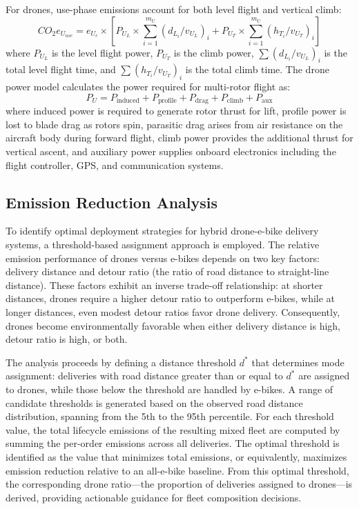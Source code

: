 \documentclass[11pt]{article}
\begin{document}
For drones, use-phase emissions account for both level flight and vertical climb:
\begin{equation}
  CO_2e_{U_{use}} = e_{U_c} \times \left[ P_{U_L} \times \sum_{i=1}^{m_U} (d_{L_i} / v_{U_L})_i + P_{U_T} \times \sum_{i=1}^{m_U} (h_{T_i} / v_{U_T})_i \right]
\end{equation}
where $P_{U_L}$ is the level flight power, $P_{U_T}$ is the climb power, $\sum (d_{L_i} / v_{U_L})_i$ is the total level flight time, and $\sum (h_{T_i} / v_{U_T})_i$ is the total climb time. The drone power model calculates the power required for multi-rotor flight as:
\begin{equation}
  P_{U} = P_{\text{induced}} + P_{\text{profile}} + P_{\text{drag}} + P_{\text{climb}} + P_{\text{aux}}
\end{equation}
where induced power is required to generate rotor thrust for lift, profile power is lost to blade drag as rotors spin, parasitic drag arises from air resistance on the aircraft body during forward flight, climb power provides the additional thrust for vertical ascent, and auxiliary power supplies onboard electronics including the flight controller, GPS, and communication systems.

\subsection{Emission Reduction Analysis}

To identify optimal deployment strategies for hybrid drone-e-bike delivery systems, a threshold-based assignment approach is employed. The relative emission performance of drones versus e-bikes depends on two key factors: delivery distance and detour ratio (the ratio of road distance to straight-line distance). These factors exhibit an inverse trade-off relationship: at shorter distances, drones require a higher detour ratio to outperform e-bikes, while at longer distances, even modest detour ratios favor drone delivery. Consequently, drones become environmentally favorable when either delivery distance is high, detour ratio is high, or both.

The analysis proceeds by defining a distance threshold $d^*$ that determines mode assignment: deliveries with road distance greater than or equal to $d^*$ are assigned to drones, while those below the threshold are handled by e-bikes. A range of candidate thresholds is generated based on the observed road distance distribution, spanning from the 5th to the 95th percentile. For each threshold value, the total lifecycle emissions of the resulting mixed fleet are computed by summing the per-order emissions across all deliveries. The optimal threshold is identified as the value that minimizes total emissions, or equivalently, maximizes emission reduction relative to an all-e-bike baseline. From this optimal threshold, the corresponding drone ratio—the proportion of deliveries assigned to drones—is derived, providing actionable guidance for fleet composition decisions.
\end{document}
